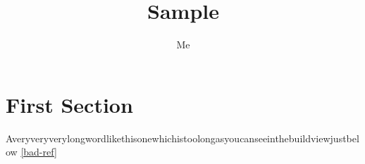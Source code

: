 \documentclass[a4paper,11pt]{article}
\title{Sample}
\author{Me}
\begin{document}
\maketitle
\tableofcontents

\section{First Section}
Averyveryverylongwordlikethisonewhichistoolongasyoucanseeinthebuildviewjustbelow
\ref{bad-ref}
\end{document}
